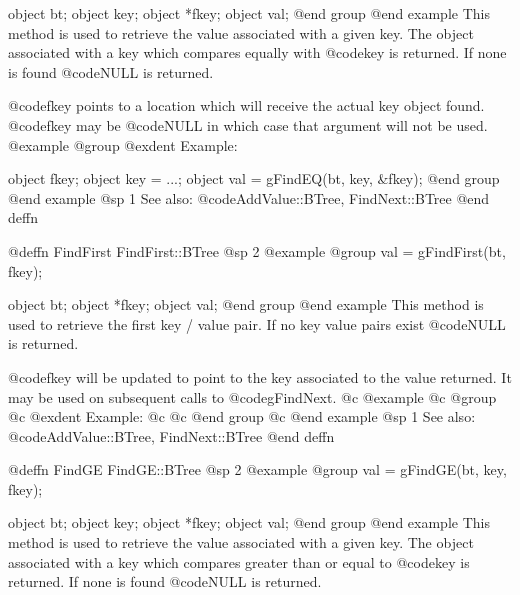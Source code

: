 object  bt;
object  key;
object  *fkey;
object  val;
@end group
@end example
This method is used to retrieve the value associated with a given key.
The object associated with a key which compares equally with @code{key}
is returned.  If none is found @code{NULL} is returned.

@code{fkey} points to a location which will receive the actual key
object found.  @code{fkey} may be @code{NULL} in which case that
argument will not be used.
@example
@group
@exdent Example:

object  fkey;
object  key = ...;
object  val = gFindEQ(bt, key, &fkey);
@end group
@end example
@sp 1
See also:  @code{AddValue::BTree, FindNext::BTree}
@end deffn



















@deffn {FindFirst} FindFirst::BTree
@sp 2
@example
@group
val = gFindFirst(bt, fkey);

object  bt;
object  *fkey;
object  val;
@end group
@end example
This method is used to retrieve the first key / value pair.  If no key
value pairs exist @code{NULL} is returned.

@code{fkey} will be updated to point to the key associated to the value
returned.  It may be used on subsequent calls to @code{gFindNext}.
@c @example
@c @group
@c @exdent Example:
@c 
@c @end group
@c @end example
@sp 1
See also:  @code{AddValue::BTree, FindNext::BTree}
@end deffn




























@deffn {FindGE} FindGE::BTree
@sp 2
@example
@group
val = gFindGE(bt, key, fkey);

object  bt;
object  key;
object  *fkey;
object  val;
@end group
@end example
This method is used to retrieve the value associated with a given key.
The object associated with a key which compares greater than or equal to
@code{key} is returned.  If none is found @code{NULL} is returned.

